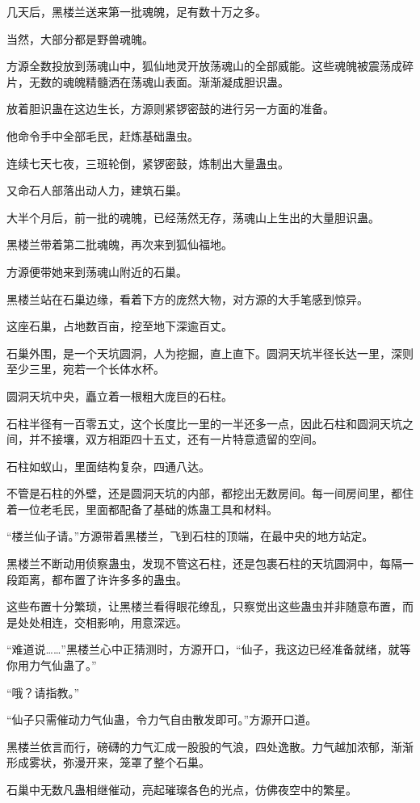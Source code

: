 \begin{this_body}
几天后，黑楼兰送来第一批魂魄，足有数十万之多。

当然，大部分都是野兽魂魄。

方源全数投放到荡魂山中，狐仙地灵开放荡魂山的全部威能。这些魂魄被震荡成碎片，无数的魂魄精髓洒在荡魂山表面。渐渐凝成胆识蛊。

放着胆识蛊在这边生长，方源则紧锣密鼓的进行另一方面的准备。

他命令手中全部毛民，赶炼基础蛊虫。

连续七天七夜，三班轮倒，紧锣密鼓，炼制出大量蛊虫。

又命石人部落出动人力，建筑石巢。

大半个月后，前一批的魂魄，已经荡然无存，荡魂山上生出的大量胆识蛊。

黑楼兰带着第二批魂魄，再次来到狐仙福地。

方源便带她来到荡魂山附近的石巢。

黑楼兰站在石巢边缘，看着下方的庞然大物，对方源的大手笔感到惊异。

这座石巢，占地数百亩，挖至地下深逾百丈。

石巢外围，是一个天坑圆洞，人为挖掘，直上直下。圆洞天坑半径长达一里，深则至少三里，宛若一个长体水杯。

圆洞天坑中央，矗立着一根粗大庞巨的石柱。

石柱半径有一百零五丈，这个长度比一里的一半还多一点，因此石柱和圆洞天坑之间，并不接壤，双方相距四十五丈，还有一片特意遗留的空间。

石柱如蚁山，里面结构复杂，四通八达。

不管是石柱的外壁，还是圆洞天坑的内部，都挖出无数房间。每一间房间里，都住着一位老毛民，里面都配备了基础的炼蛊工具和材料。

“楼兰仙子请。”方源带着黑楼兰，飞到石柱的顶端，在最中央的地方站定。

黑楼兰不断动用侦察蛊虫，发现不管这石柱，还是包裹石柱的天坑圆洞中，每隔一段距离，都布置了许许多多的蛊虫。

这些布置十分繁琐，让黑楼兰看得眼花缭乱，只察觉出这些蛊虫并非随意布置，而是处处相连，交相影响，用意深远。

“难道说……”黑楼兰心中正猜测时，方源开口，“仙子，我这边已经准备就绪，就等你用力气仙蛊了。”

“哦？请指教。”

“仙子只需催动力气仙蛊，令力气自由散发即可。”方源开口道。

黑楼兰依言而行，磅礴的力气汇成一股股的气浪，四处逸散。力气越加浓郁，渐渐形成雾状，弥漫开来，笼罩了整个石巢。

石巢中无数凡蛊相继催动，亮起璀璨各色的光点，仿佛夜空中的繁星。


\end{this_body}
